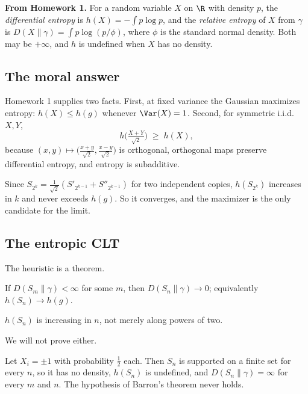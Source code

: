 \documentclass[11pt]{article}
\begin{document}
\begin{recall}
\textbf{From Homework 1.} For a random variable $X$ on $\R$ with density $p$, the \emph{differential entropy} is $h(X)=-\int p\log p$, and the \emph{relative entropy} of $X$ from $\gamma$ is $D(X\|\gamma)=\int p\log(p/\phi)$, where $\phi$ is the standard normal density. Both may be $+\infty$, and $h$ is undefined when $X$ has no density.
\end{recall}

\subsection{The moral answer}

Homework 1 supplies two facts. First, at fixed variance the Gaussian maximizes entropy: $h(X)\le h(g)$ whenever $\Var(X)=1$. Second, for symmetric i.i.d.\ $X,Y$,
\[
h\Big(\tfrac{X+Y}{\sqrt2}\Big)\;\ge\;h(X),
\]
because $(x,y)\mapsto\big(\tfrac{x+y}{\sqrt2},\tfrac{x-y}{\sqrt2}\big)$ is orthogonal, orthogonal maps preserve differential entropy, and entropy is subadditive.

Since $S_{2^k}=\tfrac{1}{\sqrt2}(S'_{2^{k-1}}+S''_{2^{k-1}})$ for two independent copies, $h(S_{2^k})$ increases in $k$ and never exceeds $h(g)$. So it converges, and the maximizer is the only candidate for the limit.

\subsection{The entropic CLT}

The heuristic is a theorem.

\begin{theorem}[Barron, 1986]
If $D(S_m\|\gamma)<\infty$ for some $m$, then $D(S_n\|\gamma)\to0$; equivalently $h(S_n)\to h(g)$.
\end{theorem}

\begin{theorem}
$h(S_n)$ is increasing in $n$, not merely along powers of two.
\end{theorem}

We will not prove either.

\begin{example}\label{ex:coin}
Let $X_i=\pm1$ with probability $\tfrac12$ each. Then $S_n$ is supported on a finite set for every $n$, so it has no density, $h(S_n)$ is undefined, and $D(S_n\|\gamma)=\infty$ for every $m$ and $n$. The hypothesis of Barron's theorem never holds.
\end{example}
\end{document}
